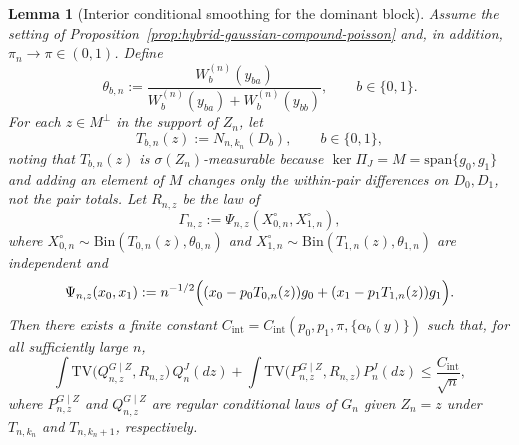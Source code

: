 \documentclass{article}
\newtheorem{lemma}[theorem]{Lemma}
\begin{document}
\begin{lemma}[Interior conditional smoothing for the dominant block]
\label{lem:interior-conditional-smoothing}
Assume the setting of Proposition~\ref{prop:hybrid-gaussian-compound-poisson} and, in addition, $\pi_n\to\pi\in(0,1)$. Define
\[
\theta_{b,n}:=\frac{W_b^{(n)}(y_{ba})}{W_b^{(n)}(y_{ba})+W_b^{(n)}(y_{bb})},
\qquad b\in\{0,1\}.
\]
For each $z\in M^\perp$ in the support of $Z_n$, let
\[
T_{b,n}(z):=N_{n,k_n}(D_b),
\qquad b\in\{0,1\},
\]
noting that $T_{b,n}(z)$ is $\sigma(Z_n)$-measurable because $\ker \Pi_J=M=\mathrm{span}\{g_0,g_1\}$ and adding an element of $M$ changes only the within-pair differences on $D_0,D_1$, not the pair totals. Let $R_{n,z}$ be the law of
\[
\Gamma_{n,z}:=\Psi_{n,z}(X_{0,n}^\circ,X_{1,n}^\circ),
\]
where $X_{0,n}^\circ\sim \mathrm{Bin}(T_{0,n}(z),\theta_{0,n})$ and $X_{1,n}^\circ\sim \mathrm{Bin}(T_{1,n}(z),\theta_{1,n})$ are independent and
\[
\Psi_{n,z}(x_0,x_1):=n^{-1/2}\Bigl((x_0-p_0T_{0,n}(z))g_0+(x_1-p_1T_{1,n}(z))g_1\Bigr).
\]
Then there exists a finite constant $C_{\mathrm{int}}=C_{\mathrm{int}}(p_0,p_1,\pi,\{\alpha_b(y)\})$ such that, for all sufficiently large $n$,
\begin{equation}
\int \mathrm{TV}\bigl(Q_{n,z}^{G\mid Z},R_{n,z}\bigr)\,Q_n^J(dz)
+\int \mathrm{TV}\bigl(P_{n,z}^{G\mid Z},R_{n,z}\bigr)\,P_n^J(dz)
\le \frac{C_{\mathrm{int}}}{\sqrt n},
\label{eq:B3-main}
\end{equation}
where $P_{n,z}^{G\mid Z}$ and $Q_{n,z}^{G\mid Z}$ are regular conditional laws of $G_n$ given $Z_n=z$ under $T_{n,k_n}$ and $T_{n,k_n+1}$, respectively.
\end{lemma}
\end{document}
